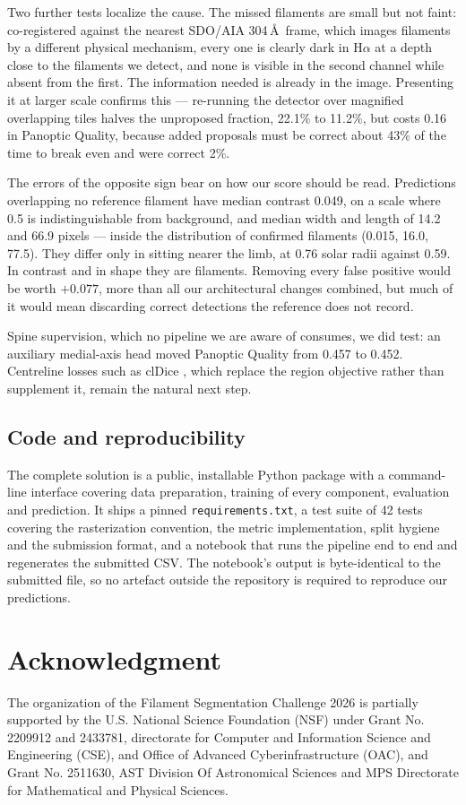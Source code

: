 \documentclass[sigconf]{acmart}
\begin{document}
    Two further tests localize the cause. The missed filaments are small but not faint: co-registered against the nearest SDO/AIA 304\,\AA\ frame, which images filaments by a different physical mechanism, every one is clearly dark in H$\alpha$ at a depth close to the filaments we detect, and none is visible in the second channel while absent from the first. The information needed is already in the image. Presenting it at larger scale confirms this --- re-running the detector over magnified overlapping tiles halves the unproposed fraction, 22.1\% to 11.2\%, but costs 0.16 in Panoptic Quality, because added proposals must be correct about 43\% of the time to break even and were correct 2\%.

    The errors of the opposite sign bear on how our score should be read. Predictions overlapping no reference filament have median contrast 0.049, on a scale where 0.5 is indistinguishable from background, and median width and length of 14.2 and 66.9 pixels --- inside the distribution of confirmed filaments (0.015, 16.0, 77.5). They differ only in sitting nearer the limb, at 0.76 solar radii against 0.59. In contrast and in shape they are filaments. Removing every false positive would be worth $+0.077$, more than all our architectural changes combined, but much of it would mean discarding correct detections the reference does not record.

    Spine supervision, which no pipeline we are aware of consumes, we did test: an auxiliary medial-axis head moved Panoptic Quality from 0.457 to 0.452. Centreline losses such as clDice \cite{shit2021cldice}, which replace the region objective rather than supplement it, remain the natural next step.

\subsection{Code and reproducibility}
    The complete solution is a public, installable Python package with a command-line interface covering data preparation, training of every component, evaluation and prediction. It ships a pinned \texttt{requirements.txt}, a test suite of 42 tests covering the rasterization convention, the metric implementation, split hygiene and the submission format, and a notebook that runs the pipeline end to end and regenerates the submitted CSV. The notebook's output is byte-identical to the submitted file, so no artefact outside the repository is required to reproduce our predictions.

\section{Acknowledgment}\label{sec:acknowledgment}
    The organization of the Filament Segmentation Challenge 2026 is partially supported by the U.S. National Science Foundation (NSF) under Grant No. 2209912 and 2433781, directorate for Computer and Information Science and Engineering (CSE), and Office of Advanced Cyberinfrastructure (OAC), and Grant No. 2511630, AST Division Of Astronomical Sciences and MPS Directorate for Mathematical and Physical Sciences.
\end{document}
